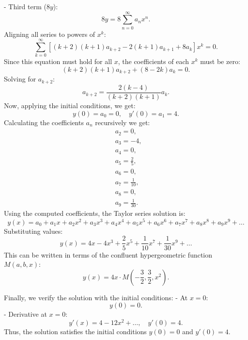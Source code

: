 \documentclass{article}
\begin{document}
\begin{enumerate}[label=(\alph*)]
{           - Third term (\( 8y \)):
             \[
             8y = 8 \sum_{n=0}^{\infty} a_n x^n.
             \]
           Aligning all series to powers of \( x^k \):
           \[
           \sum_{k=0}^{\infty} \left[(k+2)(k+1) a_{k+2} - 2(k+1) a_{k+1} + 8 a_k \right] x^k = 0.
           \]
           Since this equation must hold for all \( x \), the coefficients of each \( x^k \) must be zero:
           \[
           (k+2)(k+1) a_{k+2} + (8 - 2k) a_k = 0.
           \]
           Solving for \( a_{k+2} \):
           \[
           a_{k+2} = \frac{2(k - 4)}{(k+2)(k+1)} a_k.
           \]
            Now, applying the initial conditions, we get:
           \[
           y(0) = a_0 = 0, \quad y'(0) = a_1 = 4.
           \]
           Calculating the coefficients \( a_n \) recursively we get:
           \[
           \begin{aligned}
           & a_2 = 0, \\
           & a_3 = -4, \\
           & a_4 = 0, \\
           & a_5 = \frac{2}{5}, \\
           & a_6 = 0, \\
           & a_7 = \frac{1}{10}, \\
           & a_8 = 0, \\
           & a_9 = \frac{1}{30}.
           \end{aligned}
           \] 
           Using the computed coefficients, the Taylor series solution is:
           \[
           y(x) = a_0 + a_1 x + a_2 x^2 + a_3 x^3 + a_4 x^4 + a_5 x^5 + a_6 x^6 + a_7 x^7 + a_8 x^8 + a_9 x^9 + \dots
           \]
           Substituting values:
           \[
           y(x) = 4x - 4x^3 + \frac{2}{5} x^5 + \frac{1}{10} x^7 + \frac{1}{30} x^9 + \dots
           \] 
           This can be written in terms of the confluent hypergeometric function \( M(a, b, x) \):
           \[
           y(x) = 4x \cdot M\left(-\frac{3}{2}, \frac{3}{2}, x^2 \right).
           \]
        
           Finally, we verify the solution with the initial conditions:
           - At \( x = 0 \):
              \[
              y(0) = 0.
              \]
            - Derivative at \( x = 0 \):
              \[
              y'(x) = 4 - 12x^2 + \dots, \quad y'(0) = 4.
              \]
            Thus, the solution satisfies the initial conditions \( y(0) = 0 \) and \( y'(0) = 4 \).
    
        
    }
\end{enumerate}
\end{document}
